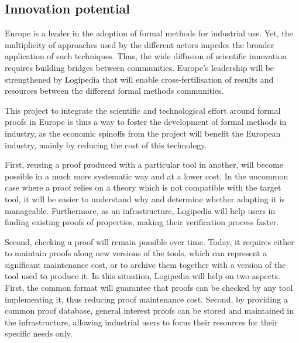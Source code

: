 \subsection*{Innovation potential}

Europe is a leader in the adoption of formal methods for
industrial use. Yet, the multiplicity of approaches used by the
different actors impedes the broader application of such
techniques. Thus, the wide diffusion of scientific innovation requires
building bridges between communities. Europe's leadership will be
strengthened by Logipedia that will enable cross-fertilisation of
results and resources between the different formal methods
communities.

This project to integrate the scientific and technological effort
around formal proofs in Europe is thus a way to foster the development
of formal methods in industry, as the economic spinoffs from the
project will benefit the European industry, mainly by reducing the
cost of this technology. 

First, reusing a proof produced with a particular tool in another, 
will become possible in a much more systematic way and at a
lower cost. In the uncommon case where a proof relies on a theory
which is not compatible with the target tool, it will be easier to
understand why and determine whether adapting it is manageable.
Furthermore, as an infrastructure, Logipedia will help users
in finding existing proofs of properties, making their verification
process faster.

Second, checking a proof will remain possible over time. Today, it
requires either to maintain proofs along new versions of the tools,
which can represent a significant maintenance cost, or to archive
them together with a version of the tool used to produce it. In this
situation, Logipedia will help on two aspects. First, the
common format will guarantee that proofs can be checked by any tool
implementing it, thus reducing proof maintenance cost. Second, by
providing a common proof database, general interest proofs can be
stored and maintained in the infrastructure, allowing industrial users
to focus their resources for their specific needs only.

